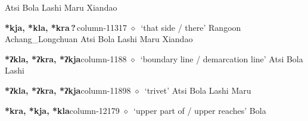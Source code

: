 \hspace{1ex}
         Atsi 
\hspace{1ex}
         Bola 
\hspace{1ex}
         Lashi 
\hspace{1ex}
         Maru 
\hspace{1ex}
         Xiandao 
  \item {\footnotesize \textbf{*kja, *kla, *kra\,?\,}}{\tiny column-11317}
         $\diamond$~`that side / there'
         Rangoon 
\hspace{1ex}
         Achang\_Longchuan 
\hspace{1ex}
         Atsi 
\hspace{1ex}
         Bola 
\hspace{1ex}
         Lashi 
\hspace{1ex}
         Maru 
\hspace{1ex}
         Xiandao 
  \item {\footnotesize \textbf{*ʔkla, *ʔkra, *ʔkja}}{\tiny column-1188}
         $\diamond$~`boundary line / demarcation line'
         Atsi 
\hspace{1ex}
         Bola 
\hspace{1ex}
         Lashi 
  \item {\footnotesize \textbf{*ʔkla, *ʔkra, *ʔkja}}{\tiny column-11898}
         $\diamond$~`trivet'
         Atsi 
\hspace{1ex}
         Bola 
\hspace{1ex}
         Lashi 
\hspace{1ex}
         Maru 
  \item {\footnotesize \textbf{*kra, *kja, *kla}}{\tiny column-12179}
         $\diamond$~`upper part of / upper reaches'
         Bola 
